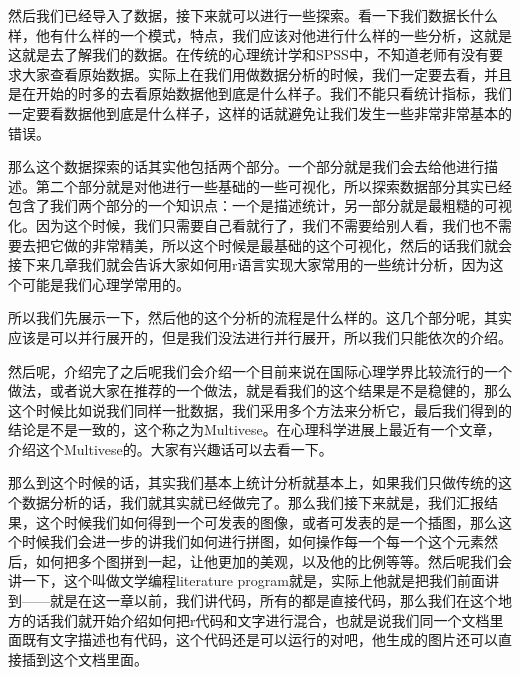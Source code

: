 \documentclass[
  oneside]{book}
\begin{document}
然后我们已经导入了数据，接下来就可以进行一些探索。看一下我们数据长什么样，他有什么样的一个模式，特点，我们应该对他进行什么样的一些分析，这就是这就是去了解我们的数据。在传统的心理统计学和SPSS中，不知道老师有没有要求大家查看原始数据。实际上在我们用做数据分析的时候，我们一定要去看，并且是在开始的时多的去看原始数据他到底是什么样子。我们不能只看统计指标，我们一定要看数据他到底是什么样子，这样的话就避免让我们发生一些非常非常基本的错误。

那么这个数据探索的话其实他包括两个部分。一个部分就是我们会去给他进行描述。第二个部分就是对他进行一些基础的一些可视化，所以探索数据部分其实已经包含了我们两个部分的一个知识点：一个是描述统计，另一部分就是最粗糙的可视化。因为这个时候，我们只需要自己看就行了，我们不需要给别人看，我们也不需要去把它做的非常精美，所以这个时候是最基础的这个可视化，然后的话我们就会接下来几章我们就会告诉大家如何用r语言实现大家常用的一些统计分析，因为这个可能是我们心理学常用的。

所以我们先展示一下，然后他的这个分析的流程是什么样的。这几个部分呢，其实应该是可以并行展开的，但是我们没法进行并行展开，所以我们只能依次的介绍。

然后呢，介绍完了之后呢我们会介绍一个目前来说在国际心理学界比较流行的一个做法，或者说大家在推荐的一个做法，就是看我们的这个结果是不是稳健的，那么这个时候比如说我们同样一批数据，我们采用多个方法来分析它，最后我们得到的结论是不是一致的，这个称之为Multivese。在心理科学进展上最近有一个文章，介绍这个Multivese的。大家有兴趣话可以去看一下。

那么到这个时候的话，其实我们基本上统计分析就基本上，如果我们只做传统的这个数据分析的话，我们就其实就已经做完了。那么我们接下来就是，我们汇报结果，这个时候我们如何得到一个可发表的图像，或者可发表的是一个插图，那么这个时候我们会进一步的讲我们如何进行拼图，如何操作每一个每一个这个元素然后，如何把多个图拼到一起，让他更加的美观，以及他的比例等等。然后呢我们会讲一下，这个叫做文学编程literature
program就是，实际上他就是把我们前面讲到------就是在这一章以前，我们讲代码，所有的都是直接代码，那么我们在这个地方的话我们就开始介绍如何把r代码和文字进行混合，也就是说我们同一个文档里面既有文字描述也有代码，这个代码还是可以运行的对吧，他生成的图片还可以直接插到这个文档里面。
\end{document}
